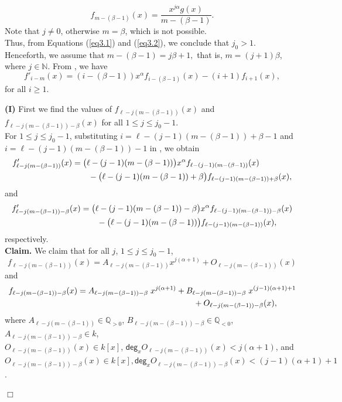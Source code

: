 \documentclass[12pt,reqno]{amsart}
\renewcommand{\deg}{\mathsf{deg}}
\renewcommand{\leq}{\leqslant}
\renewcommand{\geq}{\geqslant}
\numberwithin{thm}{section}
\theoremstyle{definition}
\numberwithin{equation}{thm}
\renewenvironment{proof}{\par\noindent {\em Proof:}}{\hfill$\Box$\medskip}
\theoremstyle{plain}
\begin{document}
\begin{proof}
\begin{equation}\label{eq3.2}
    f_{m-(\beta-1)}(x)=\frac{x^{j\alpha} g(x)}{m-(\beta-1)}.
\end{equation}
Note that $j\neq 0$, otherwise $m=\beta$, which is not possible.\\
Thus, from Equations (\ref{eq3.1}) and (\ref{eq3.2}), we conclude that $j_0>1$.\\
Henceforth, we assume that $m-(\beta-1)=j\beta+1,$ that is, $m=(j+1)\beta$, where $j\in \mathbb{N}$.
From , we have
\begin{equation}\label{eq3.3}
f'_{i-m}(x)=(i-(\beta-1))x^\alpha f_{i-(\beta-1)}(x)-(i+1)f_{i+1}(x),
\end{equation}
for all $i\geq1$.

\medskip
\noindent
\textbf{(I)} First we find the values of $f_{\ell-j(m-(\beta-1))}(x)$ and $f_{\ell-j(m-(\beta-1))-\beta}(x)$ for all $1\leq j\leq j_0-1$.\\
For $1\leq j\leq j_0-1$, substituting $i=\ell-(j-1)(m-(\beta-1))+\beta-1$ and $i=\ell-(j-1)(m-(\beta-1))-1$ in , we obtain
\begin{align}\label{eq3.4}
f'_{\ell-j(m-(\beta-1))}(x) &=\bigl(\ell-(j-1)(m-(\beta-1))\bigr)x^\alpha f_{\ell-(j-1)(m-(\beta-1))}(x)\notag\\
&\qquad -\bigl(\ell-(j-1)(m-(\beta-1))+\beta \bigr)f_{\ell-(j-1)(m-(\beta-1))+\beta}(x),
\end{align}
and
\begin{align}\label{eq3.5}
f'_{\ell-j(m-(\beta-1))-\beta}(x) &= \bigl(\ell-(j-1)(m-(\beta-1))-\beta\bigr)x^\alpha f_{\ell-(j-1)(m-(\beta-1))-\beta}(x)\notag \\
& \qquad-\bigl(\ell-(j-1)(m-(\beta-1))\bigr)f_{\ell-(j-1)(m-(\beta-1))}(x),
\end{align}
respectively.\\
\noindent\textbf{Claim.} We claim that for all $j$, $1\leq j\leq j_0-1$,
\begin{equation}\label{eq3.6}
f_{\ell-j(m-(\beta-1))}(x)=A_{\ell-j(m-(\beta-1))}x^{j(\alpha+1)}+O_{\ell-j(m-(\beta-1))}(x)
\end{equation}
and
\begin{align}\label{eq3.7}
    f_{\ell-j(m-(\beta-1))-\beta}(x)&=A_{\ell-j(m-(\beta-1))-\beta}\;x^{j(\alpha+1)}+B_{\ell-j(m-(\beta-1))-\beta}\;x^{(j-1)(\alpha+1)+1}\notag \\
    &\hspace{5cm}+O_{\ell-j(m-(\beta-1))-\beta}(x),
\end{align}
where $A_{\ell-j(m-(\beta-1))}\in \mathbb{Q}_{>0}$, $B_{\ell-j(m-(\beta-1))-\beta}\in \mathbb{Q}_{<0}$, $A_{\ell-j(m-(\beta-1))-\beta}\in k$, \\
$O_{\ell-j(m-(\beta-1))}(x)\in k[x]$, $\deg_x O_{\ell-j(m-(\beta-1))}(x)<j(\alpha+1)$, and $O_{\ell-j(m-(\beta-1))-\beta}(x)\in k[x],\deg_x O_{\ell-j(m-(\beta-1))-\beta}(x)<(j-1)(\alpha+1)+1$.


\end{proof}
\end{document}
